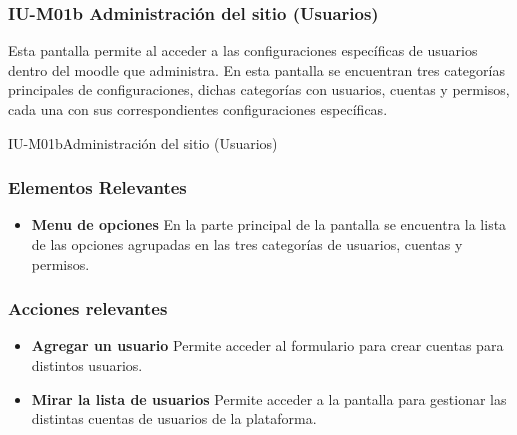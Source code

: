 
\subsubsection{IU-M01b Administración del sitio (Usuarios)}

 Esta pantalla permite al  acceder a las configuraciones
 específicas de usuarios dentro del moodle que administra. En esta pantalla se
 encuentran tres categorías principales de configuraciones, dichas categorías con
 usuarios, cuentas y permisos, cada una con sus correspondientes configuraciones
 específicas.

        {IU-M01b}{Administración del sitio (Usuarios)}

\subsubsection{Elementos Relevantes}

    \begin{itemize}
    \item {\bf Menu de opciones}
        En la parte principal de la pantalla se encuentra la lista de las
        opciones agrupadas en las tres categorías de usuarios, cuentas y permisos.
    \end{itemize}

\subsubsection{Acciones relevantes}

    \begin{itemize}
    \item {\bf Agregar un usuario}
        Permite acceder al formulario para crear cuentas para distintos usuarios.

    \item {\bf Mirar la lista de usuarios}
        Permite acceder a la pantalla para gestionar las distintas cuentas de usuarios
        de la plataforma.
    \end{itemize}

\clearpage
